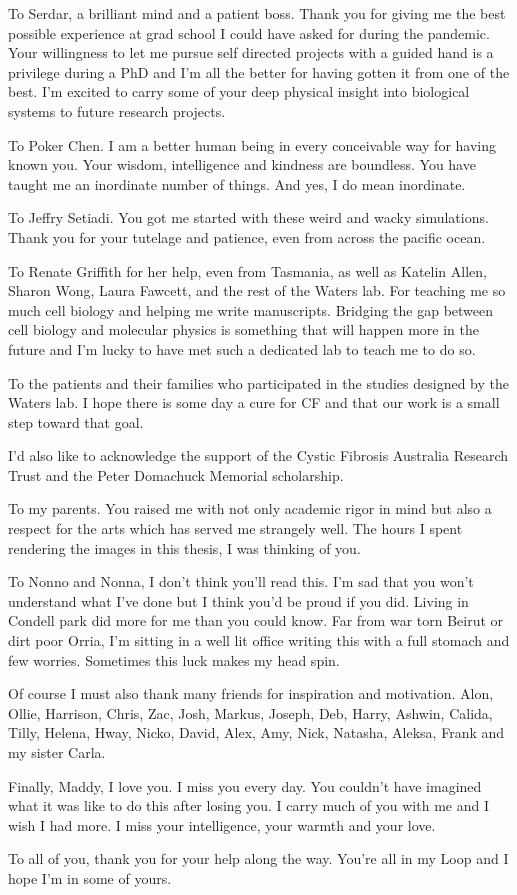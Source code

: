 To Serdar, a brilliant mind and a patient boss. Thank you for giving me the best possible experience at grad school I could have asked for during the pandemic. Your willingness to let me pursue self directed projects with a guided hand is a privilege during a PhD and I'm all the better for having gotten it from one of the best. I'm excited to carry some of your deep physical insight into biological systems to future research projects. 

To Poker Chen. I am a better human being in every conceivable way for having known you. Your wisdom, intelligence and kindness are boundless. You have taught me an inordinate number of things. And yes, I do mean inordinate.

To Jeffry Setiadi. You got me started with these weird and wacky simulations. Thank you for your tutelage and patience, even from across the pacific ocean.

To Renate Griffith for her help, even from Tasmania, as well as Katelin Allen, Sharon Wong, Laura Fawcett, and the rest of the Waters lab. For teaching me so much cell biology and helping me write manuscripts. Bridging the gap between cell biology and molecular physics is something that will happen more in the future and I'm lucky to have met such a dedicated lab to teach me to do so.

To the patients and their families who participated in the studies designed by the Waters lab. I hope there is some day a cure for CF and that our work is a small step toward that goal.

I'd also like to acknowledge the support of the Cystic Fibrosis Australia Research Trust and the Peter Domachuck Memorial scholarship.

To my parents. You raised me with not only academic rigor in mind but also a respect for the arts which has served me strangely well. The hours I spent rendering the images in this thesis, I was thinking of you.

To Nonno and Nonna, I don't think you'll read this. I'm sad that you won't understand what I've done but I think you'd be proud if you did. Living in Condell park did more for me than you could know. Far from war torn Beirut or dirt poor Orria, I'm sitting in a well lit office writing this with a full stomach and few worries. Sometimes this luck makes my head spin. 

Of course I must also thank many friends for inspiration and motivation. Alon, Ollie, Harrison, Chris, Zac, Josh, Markus, Joseph, Deb, Harry, Ashwin, Calida, Tilly, Helena, Hway, Nicko, David, Alex, Amy, Nick, Natasha, Aleksa, Frank and my sister Carla.

Finally, Maddy, I love you. I miss you every day. You couldn't have imagined what it was like to do this after losing you. I carry much of you with me and I wish I had more. I miss your intelligence, your warmth and your love.

To all of you, thank you for your help along the way. You're all in my Loop \cite{hofstadter2007} and I hope I'm in some of yours.

